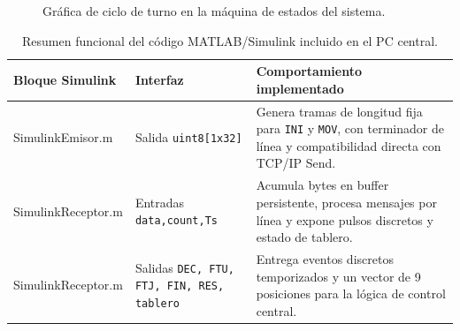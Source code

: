 \documentclass[12pt,a4paper]{article}
\begin{document}
\begin{figure}[h]
\centering
{}
\caption{Gráfica de ciclo de turno en la máquina de estados del sistema.}
\end{figure}

\begin{table}[H]
\centering
\footnotesize
\begin{tabular}{P{0.24\textwidth} P{0.18\textwidth} P{0.48\textwidth}}
\toprule
\textbf{Bloque Simulink} & \textbf{Interfaz} & \textbf{Comportamiento implementado} \\
\midrule
SimulinkEmisor.m & Salida \texttt{uint8[1x32]} & Genera tramas de longitud fija para \texttt{INI} y \texttt{MOV}, con terminador de línea y compatibilidad directa con TCP/IP Send. \\
SimulinkReceptor.m & Entradas \texttt{data,count,Ts} & Acumula bytes en buffer persistente, procesa mensajes por línea y expone pulsos discretos y estado de tablero. \\
SimulinkReceptor.m & Salidas \texttt{DEC, FTU, FTJ, FIN, RES, tablero} & Entrega eventos discretos temporizados y un vector de 9 posiciones para la lógica de control central. \\
\bottomrule
\end{tabular}
\caption{Resumen funcional del código MATLAB/Simulink incluido en el PC central.}
\end{table}
\end{document}
